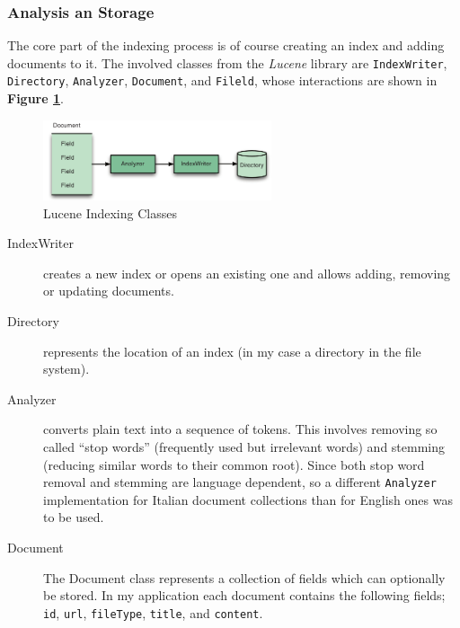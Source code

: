 \documentclass[a4paper]{usiinfbachelorproject}
\begin{document}
\subsubsection{Analysis an Storage}

The core part of the indexing process is of course creating an index and adding documents to it. The involved classes from the \emph{Lucene} 
library are \texttt{IndexWriter}, \texttt{Directory}, \texttt{Analyzer}, \texttt{Document}, and \texttt{Fileld}, whose 
interactions are shown in \textbf{Figure \ref{fig:luceneIndexClasses}}.

\begin{figure}[h!]
\centering
\includegraphics[width=0.6\textwidth]{figures/luceneIndexClasses}
\caption{Lucene Indexing Classes}
\label{fig:luceneIndexClasses}
\end{figure}

\begin{description}

    \item[IndexWriter] creates a new index or opens an existing one and allows adding, removing or updating documents.

    \item[Directory] represents the location of an index (in my case a directory in the file system).

    \item[Analyzer] converts plain text into a sequence of tokens. This involves removing so called ``stop words'' 
        (frequently used but irrelevant words) and stemming (reducing similar words to their common root). Since
        both stop word removal and stemming are language dependent, so a different \texttt{Analyzer} implementation
        for Italian document collections than for English ones was to be used.

    \item[Document] The Document class represents a collection of fields which can optionally be stored. 
        In my application each document contains the following fields; \texttt{id}, \texttt{url}, 
        \texttt{fileType}, \texttt{title}, and \texttt{content}.

\end{description}
\end{document}
